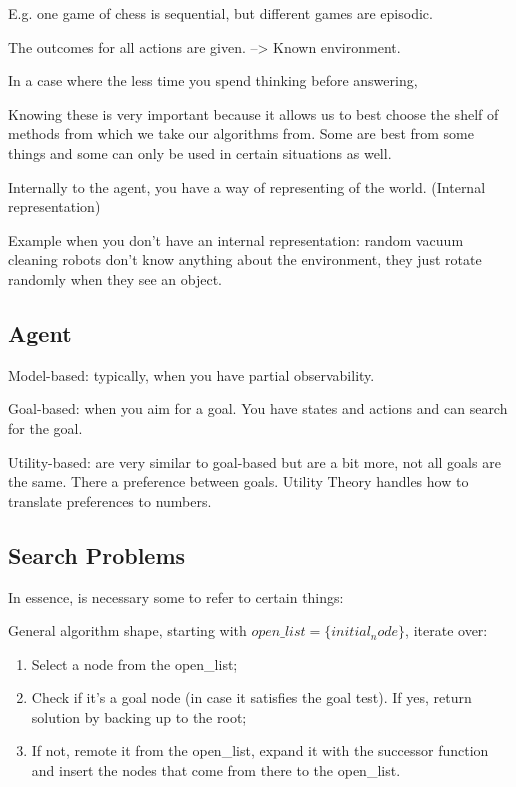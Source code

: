 E.g. one game of chess is sequential, but different games are episodic.


The outcomes for all actions are given. --> Known environment.



In a case where the less time you spend thinking before answering, 


Knowing these is very important because it allows us to best choose the shelf of methods from which we take our algorithms from. Some are best from some things and some can only be used in certain situations as well.


Internally to the agent, you have a way of representing of the world. (Internal representation)

Example when you don't have an internal representation: random vacuum cleaning robots don't know anything about the environment, they just rotate randomly when they see an object.




\subsection{Agent}

Model-based: typically, when you have partial observability.

Goal-based: when you aim for a goal. You have states and actions and can search for the goal.

Utility-based: are very similar to goal-based but are a bit more, not all goals are the same. There a preference between goals. 
Utility Theory handles how to translate preferences to numbers. 







\subsection{Search Problems}

In essence, is necessary some  to refer to certain things:


General algorithm shape, starting with $open\_list = \{initial_node\}$, iterate over:
\begin{enumerate}
    \item Select a node from the open\_list;
    \item Check if it's a goal node (in case it satisfies the goal test). If yes, return solution by backing up to the root;
    \item If not, remote it from the open\_list, expand it with the successor function and insert the nodes that come from there to the open\_list.
\end{enumerate}

